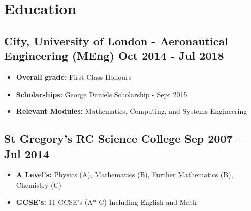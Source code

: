 \documentclass[a4paper,9pt]{article}
\begin{document}


\section*{Education}
\subsection*{\textbf {City, University of London - Aeronautical Engineering (MEng)}  \hfill Oct 2014 - Jul 2018}\FloatBarrier
\begin{itemize}[noitemsep]
	\item \textbf{Overall grade:} First Class Honours %
	\item \textbf{Scholarships:} George Daniels Scholarship - Sept 2015
\item \textbf{Relevant Modules:} Mathematics, Computing, and Systems Engineering
\end{itemize}


\subsection*{\textbf{St Gregory’s RC Science College} \hfill  Sep 2007 – Jul 2014}
\begin{itemize}[noitemsep]
    \item \textbf{A Level's:} Physics (A), Mathematics (B), Further Mathematics (B), Chemistry (C)
    \item \textbf{GCSE’s:} 11 GCSE’s (A*-C) Including English and Math
\end{itemize}



\date{}
\end{document}
